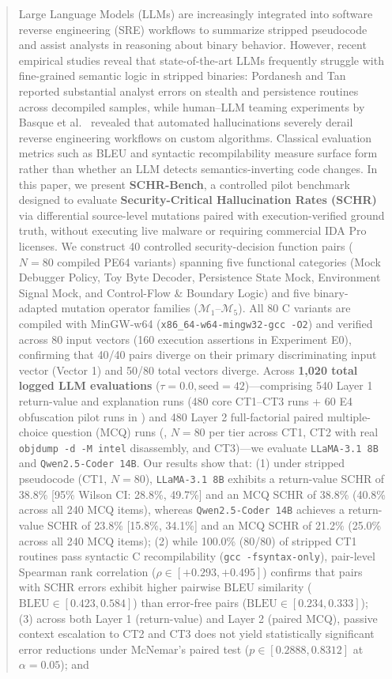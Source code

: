 \documentclass[conference]{IEEEtran}
\begin{document}
\begin{abstract}
Large Language Models (LLMs) are increasingly integrated into software reverse engineering (SRE) workflows to summarize stripped pseudocode and assist analysts in reasoning about binary behavior. However, recent empirical studies reveal that state-of-the-art LLMs frequently struggle with fine-grained semantic logic in stripped binaries: Pordanesh and Tan~\cite{pordanesh2024exploring} reported substantial analyst errors on stealth and persistence routines across decompiled samples, while human--LLM teaming experiments by Basque et al.~\cite{basque2026decompiling} revealed that automated hallucinations severely derail reverse engineering workflows on custom algorithms. Classical evaluation metrics such as BLEU and syntactic recompilability measure surface form rather than whether an LLM detects semantics-inverting code changes. In this paper, we present \textbf{SCHR-Bench}, a controlled pilot benchmark designed to evaluate \textbf{Security-Critical Hallucination Rates (SCHR)} via differential source-level mutations paired with execution-verified ground truth, without executing live malware or requiring commercial IDA Pro licenses. We construct 40 controlled security-decision function pairs ($N = 80$ compiled PE64 variants) spanning five functional categories (Mock Debugger Policy, Toy Byte Decoder, Persistence State Mock, Environment Signal Mock, and Control-Flow \& Boundary Logic) and five binary-adapted mutation operator families ($\mathcal{M}_1$--$\mathcal{M}_5$). All 80 C variants are compiled with MinGW-w64 (\texttt{x86\_64-w64-mingw32-gcc -O2}) and verified across 80 input vectors (160 execution assertions in Experiment E0), confirming that 40/40 pairs diverge on their primary discriminating input vector (Vector 1) and 50/80 total vectors diverge. Across \textbf{1,020 total logged LLM evaluations} ($\tau = 0.0, \text{seed} = 42$)---comprising 540 Layer 1 return-value and explanation runs (480 core CT1--CT3 runs + 60 E4 obfuscation pilot runs in ) and 480 Layer 2 full-factorial paired multiple-choice question (MCQ) runs (, $N=80$ per tier across CT1, CT2 with real \texttt{objdump -d -M intel} disassembly, and CT3)---we evaluate \texttt{LLaMA-3.1 8B} and \texttt{Qwen2.5-Coder 14B}. Our results show that: (1) under stripped pseudocode (CT1, $N=80$), \texttt{LLaMA-3.1 8B} exhibits a return-value SCHR of 38.8\% [95\% Wilson CI: 28.8\%, 49.7\%] and an MCQ SCHR of 38.8\% (40.8\% across all 240 MCQ items), whereas \texttt{Qwen2.5-Coder 14B} achieves a return-value SCHR of 23.8\% [15.8\%, 34.1\%] and an MCQ SCHR of 21.2\% (25.0\% across all 240 MCQ items); (2) while 100.0\% (80/80) of stripped CT1 routines pass syntactic C recompilability (\texttt{gcc -fsyntax-only}), pair-level Spearman rank correlation ($\rho \in [+0.293, +0.495]$) confirms that pairs with SCHR errors exhibit higher pairwise BLEU similarity ($\text{BLEU} \in [0.423, 0.584]$) than error-free pairs ($\text{BLEU} \in [0.234, 0.333]$); (3) across both Layer 1 (return-value) and Layer 2 (paired MCQ), passive context escalation to CT2 and CT3 does not yield statistically significant error reductions under McNemar's paired test ($p \in [0.2888, 0.8312]$ at $\alpha = 0.05$); and 
\end{abstract}
\end{document}

